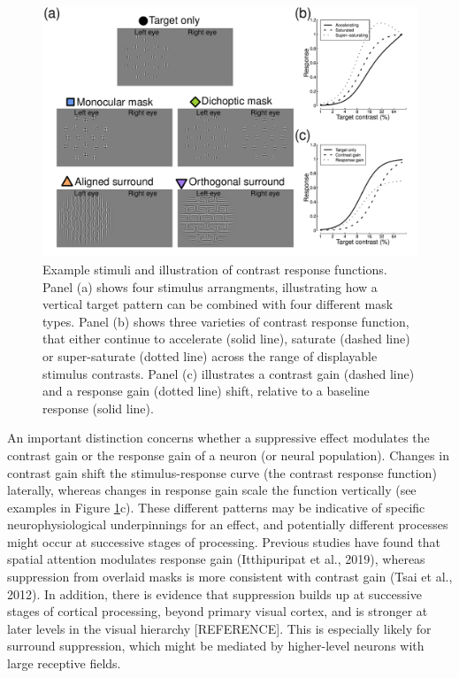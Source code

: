 \documentclass[]{article}
\begin{document}
\begin{figure}

{\centering \includegraphics{figures/stimfig} 

}

\caption{Example stimuli and illustration of contrast response functions. Panel (a) shows four stimulus arrangments, illustrating how a vertical target pattern can be combined with four different mask types. Panel (b) shows three varieties of contrast response function, that either continue to accelerate (solid line), saturate (dashed line) or super-saturate (dotted line) across the range of displayable stimulus contrasts. Panel (c) illustrates a contrast gain (dashed line) and a response gain (dotted line) shift, relative to a baseline response (solid line).}\label{fig:stimfig}
\end{figure}

An important distinction concerns whether a suppressive effect modulates the contrast gain or the response gain of a neuron (or neural population). Changes in contrast gain shift the stimulus-response curve (the contrast response function) laterally, whereas changes in response gain scale the function vertically (see examples in Figure \ref{fig:stimfig}c). These different patterns may be indicative of specific neurophysiological underpinnings for an effect, and potentially different processes might occur at successive stages of processing. Previous studies have found that spatial attention modulates response gain (Itthipuripat et al., 2019), whereas suppression from overlaid masks is more consistent with contrast gain (Tsai et al., 2012). In addition, there is evidence that suppression builds up at successive stages of cortical processing, beyond primary visual cortex, and is stronger at later levels in the visual hierarchy {[}REFERENCE{]}. This is especially likely for surround suppression, which might be mediated by higher-level neurons with large receptive fields.
\end{document}
